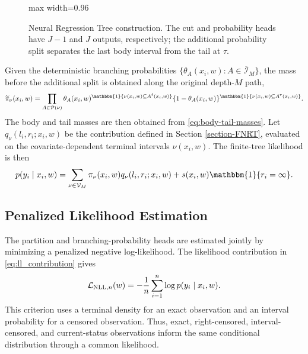 \documentclass[11pt]{article}
\numberwithin{equation}{section}
\begin{document}
\begin{figure}[ht]
\begin{adjustbox}{max width=0.96\textwidth}
\end{adjustbox}
\caption{Neural Regression Tree construction. The cut and probability heads have $J-1$ and $J$ outputs, respectively; the additional probability split separates the last body interval from the tail at $\tau$.}
\label{fig:nn-structure}
\end{figure}

Given the deterministic branching probabilities $\{\theta_A(x_i,w):A\in\overline{\mathcal I}_M\}$, the mass before the additional split is obtained along the original depth-$M$ path,
$$
    \widetilde\pi_{\nu}(x_i,w)
    =
    \prod_{A\in \mathcal{P}(\nu)}
    \theta_A(x_i,w)^{\mathbbm{1}\{\nu(x_i,w)\subseteq A^\ell(x_i,w)\}}
    \{1-\theta_A(x_i,w)\}^{\mathbbm{1}\{\nu(x_i,w)\subseteq A^r(x_i,w)\}} .
$$
The body and tail masses are then obtained from \eqref{eq:body-tail-masses}. Let $q_\nu(l_i,r_i;x_i,w)$ be the contribution defined in Section \ref{section-FNRT}, evaluated on the covariate-dependent terminal intervals $\nu(x_i,w)$. The finite-tree likelihood is then
\begin{equation}
    p(y_i\mid x_i,w)
    =
    \sum_{\nu\in\mathcal V_M}
    \pi_{\nu}(x_i,w)
    q_{\nu}(l_i,r_i;x_i,w)+s(x_i,w)\mathbbm{1}\{r_i=\infty\}.
\label{eq:ll_contribution}
\end{equation}
\subsection{Penalized Likelihood Estimation}
\label{section-nrt-estimation}

The partition and branching-probability heads are estimated jointly by minimizing a penalized negative log-likelihood. The likelihood contribution in \eqref{eq:ll_contribution} gives
\begin{equation}
    \mathcal{L}_{\mathrm{NLL},n}(w)
    =-\frac{1}{n}\sum_{i=1}^n\log p(y_i\mid x_i,w).
    \label{eq:nll}
\end{equation}
This criterion uses a terminal density for an exact observation and an interval probability for a censored observation. Thus, exact, right-censored, interval-censored, and current-status observations inform the same conditional distribution through a common likelihood.
\end{document}
